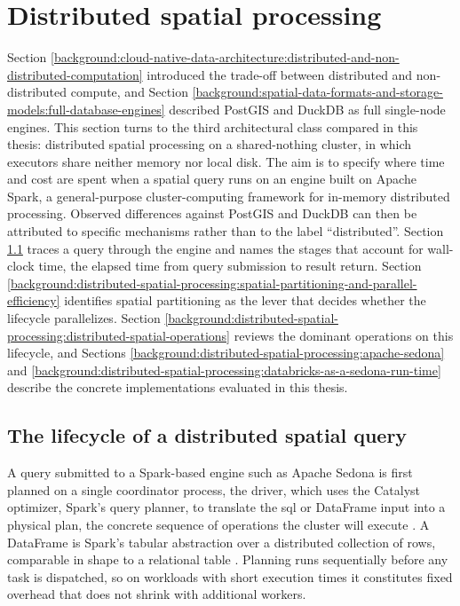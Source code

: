 \section{Distributed spatial processing}
\label{background:distributed-spatial-processing}
Section \ref{background:cloud-native-data-architecture:distributed-and-non-distributed-computation} introduced the trade-off between distributed and non-distributed compute, and Section \ref{background:spatial-data-formats-and-storage-models:full-database-engines} described PostGIS and DuckDB as full single-node engines. This section turns to the third architectural class compared in this thesis: distributed spatial processing on a shared-nothing cluster, in which executors share neither memory nor local disk. The aim is to specify where time and cost are spent when a spatial query runs on an engine built on Apache Spark, a general-purpose cluster-computing framework for in-memory distributed processing. Observed differences against PostGIS and DuckDB can then be attributed to specific mechanisms rather than to the label \enquote{distributed}. Section \ref{background:distributed-spatial-processing:the-lifecycle-of-a-distributed-spatial-query} traces a query through the engine and names the stages that account for wall-clock time, the elapsed time from query submission to result return. Section \ref{background:distributed-spatial-processing:spatial-partitioning-and-parallel-efficiency} identifies spatial partitioning as the lever that decides whether the lifecycle parallelizes. Section \ref{background:distributed-spatial-processing:distributed-spatial-operations} reviews the dominant operations on this lifecycle, and Sections \ref{background:distributed-spatial-processing:apache-sedona} and \ref{background:distributed-spatial-processing:databricks-as-a-sedona-run-time} describe the concrete implementations evaluated in this thesis.

\subsection{The lifecycle of a distributed spatial query}
\label{background:distributed-spatial-processing:the-lifecycle-of-a-distributed-spatial-query}
A query submitted to a Spark-based engine such as Apache Sedona is first planned on a single coordinator process, the driver, which uses the Catalyst optimizer, Spark's query planner, to translate the \acrshort{sql} or DataFrame input into a physical plan, the concrete sequence of operations the cluster will execute \parencite{armbrust2015_spark_sql_relational_data_processing, spark2024_cluster_mode_overview}. A DataFrame is Spark's tabular abstraction over a distributed collection of rows, comparable in shape to a relational table \parencite{armbrust2015_spark_sql_relational_data_processing}. Planning runs sequentially before any task is dispatched, so on workloads with short execution times it constitutes fixed overhead that does not shrink with additional workers.


